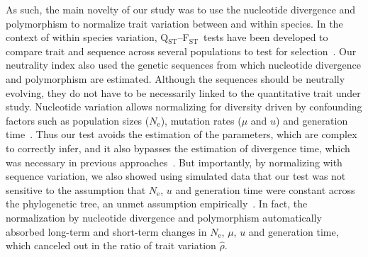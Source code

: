 \documentclass{article}
\newcommand{\Qst}{Q$_\text{ST}$}
\newcommand{\Fst}{F$_\text{ST}$}
\newcommand{\QstFst}{\Qst--\Fst}
\newcommand{\Ne}{N_{\text{e}}}
\newcommand{\MutationRatePheno}{\mu}
\newcommand{\MutationRateNuc}{u}
\newcommand{\EstNI}{\widehat{\rho}}
\begin{document}
As such, the main novelty of our study was to use the nucleotide divergence and polymorphism to normalize trait variation between and within species.
In the context of within species variation, \QstFst\ tests have been developed to compare trait and sequence across several populations to test for selection~\parencite{martin_multivariate_2008, leinonen_qst_2013}.
Our neutrality index also used the genetic sequences from which nucleotide divergence and polymorphism are estimated.
Although the sequences should be neutrally evolving, they do not have to be necessarily linked to the quantitative trait under study.
Nucleotide variation allows normalizing for diversity driven by confounding factors such as population sizes ($\Ne$), mutation rates ($\MutationRatePheno$ and $\MutationRateNuc$) and generation time~\parencite{hansen_translating_1996, harmon_phylogenetic_2018}.
Thus our test avoids the estimation of the parameters, which are complex to correctly infer, and it also bypasses the estimation of divergence time, which was necessary in previous approaches~\parencite{walsh_evolution_2018}.
But importantly, by normalizing with sequence variation, we also showed using simulated data that our test was not sensitive to the assumption that $\Ne$, $\MutationRateNuc$ and generation time were constant across the phylogenetic tree, an unmet assumption empirically~\parencite{bergeron_evolution_2023, wilder_contribution_2023}.
In fact, the normalization by nucleotide divergence and polymorphism automatically absorbed long-term and short-term changes in $\Ne$, $\MutationRatePheno$, $\MutationRateNuc$ and generation time, which canceled out in the ratio of trait variation $\EstNI$.
\end{document}
